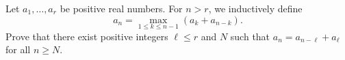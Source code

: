Let $a_1, \ldots, a_r$ be positive real numbers. For $n > r$, we inductively define
\[
a_n = \max_{1 \leq k \leq n-1} (a_k + a_{n-k}). \tag{1}
\]
Prove that there exist positive integers $\ell \leq r$ and $N$ such that $a_n = a_{n-\ell} + a_\ell$ for all $n \geq N$.
